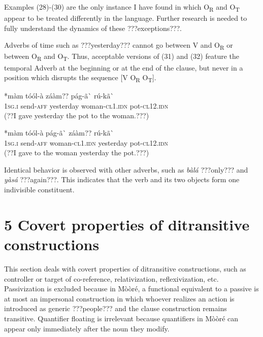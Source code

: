 \documentclass[output=paper]{langsci/langscibook}
\begin{document}
Examples (28){}-(30) are the only instance I have found in which O\textsubscript{R} and O\textsubscript{T} appear to be treated differently in the language. Further research is needed to fully understand the dynamics of these ???exceptions???.


Adverbs of time such as ???yesterday??? cannot go between V and O\textsubscript{R} or between O\textsubscript{R} and O\textsubscript{T}. Thus, acceptable versions of (31) and (32) feature the temporal Adverb at the beginning or at the end of the clause, but never in a position which disrupts the sequence [V O\textsubscript{R} O\textsubscript{T}].


\ea \gll 
\label{bkm:Ref424317802}*màm    tóól-à    záàm??    pág-ã\`{ }      rú-kã\`{ }
\\
%
\textsc{1sg.i  }    send-\textsc{aff}  yesterday  woman-\textsc{cl1.idn}  pot-\textsc{cl12.idn}
\\\glt
(??I gave yesterday the pot to the woman.???)
\z


\ea \gll 
\label{bkm:Ref424317812}*màm    tóól-à    pág-ã\`{ }      záàm??    rú-kã\`{ }
\\
%
\textsc{1sg.i  }    send-\textsc{aff}  woman\textsc{{}-cl1.idn}  yesterday  pot-\textsc{cl12.idn}
\\\glt
(??I gave to the woman yesterday the pot.???)
\z

Identical behavior is observed with other adverbs, such as \textit{bàlá} ???only??? and \textit{yàsá} ???again???. This indicates that the verb and its two objects form one indivisible constituent.

\section{5 Covert properties of ditransitive constructions }

This section deals with covert properties of ditransitive constructions, such as controller or target of co-reference, relativization, reflexivization, etc. Passivization is excluded because in Mòòré, a functional equivalent to a passive is at most an impersonal construction in which whoever realizes an action is introduced as generic ???people??? and the clause construction remains transitive. Quantifier floating is irrelevant because quantifiers in Mòòré can appear only immediately after the noun they modify. 
\end{document}
